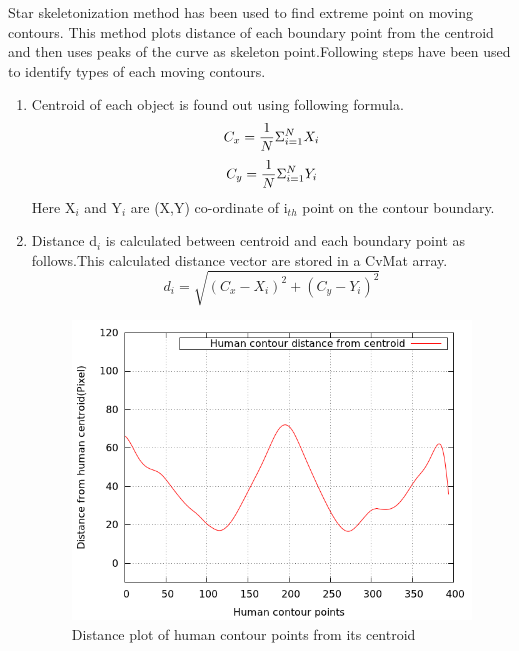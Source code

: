 Star skeletonization method has been used to find extreme point on
moving contours. This method plots distance of each boundary point from
the centroid and then uses peaks of the curve as skeleton
point.Following steps have been used to identify types of each moving
contours.
\begin{enumerate}
\item Centroid of each object is found out using following formula.\\
	\begin{equation}
	C_x = {1 \over N} \Sigma ^N _{i = 1} X_i 
	\end{equation}
	\begin{equation}
	C_y = {1 \over N} \Sigma ^N _{i = 1} Y_i 
	\end{equation}
Here X$_i$ and Y$_i$ are (X,Y) co-ordinate of i$_{th}$ point on the contour
boundary.
\item Distance d$_i$ is calculated between centroid and each boundary
point as follows.This calculated distance vector are stored in a CvMat
array.
	\begin{equation}
	d_i = \sqrt{(C_x - X_i)^2 + (C_y - Y_i)^2}
	\end{equation}

\begin{figure}[!b]
\centering
\includegraphics[scale=0.60]{Figures/distance}
\caption{Distance plot of human contour points from its centroid}
\label{distance}
\end{figure}


\end{enumerate}
